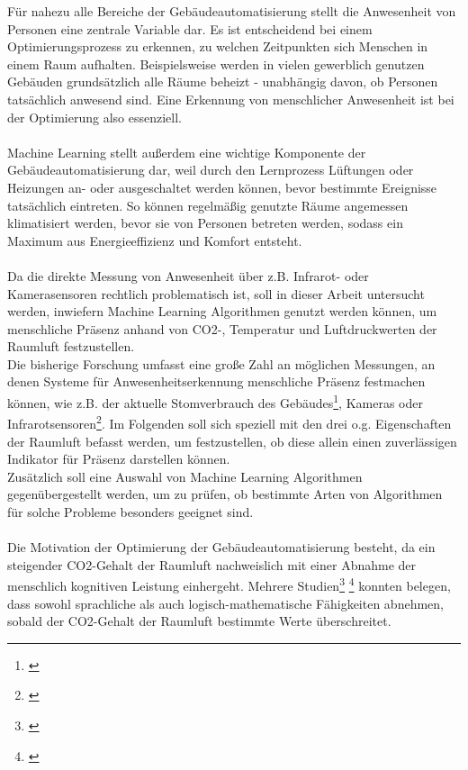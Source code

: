 Für nahezu alle Bereiche der Gebäudeautomatisierung stellt die Anwesenheit 
von Personen eine zentrale Variable dar. Es ist entscheidend bei einem Optimierungsprozess zu erkennen, zu
welchen Zeitpunkten sich Menschen in einem Raum aufhalten. Beispielsweise werden in vielen gewerblich 
genutzen Gebäuden grundsätzlich alle Räume beheizt - unabhängig davon, ob Personen tatsächlich anwesend sind. 
Eine Erkennung von menschlicher Anwesenheit ist bei der Optimierung also essenziell.\\\\
Machine Learning stellt außerdem eine wichtige Komponente der Gebäudeautomatisierung dar, weil durch den
Lernprozess Lüftungen oder Heizungen an- oder ausgeschaltet werden können, bevor bestimmte Ereignisse 
tatsächlich eintreten. So können regelmäßig genutzte Räume angemessen klimatisiert werden, bevor sie von 
Personen betreten werden, sodass ein Maximum aus Energieeffizienz und Komfort entsteht.\\\\
Da die direkte Messung von Anwesenheit über z.B. Infrarot- oder Kamerasensoren rechtlich problematisch ist, 
soll in dieser Arbeit untersucht werden, inwiefern Machine Learning Algorithmen genutzt werden können, 
um menschliche Präsenz anhand von CO2-, Temperatur und Luftdruckwerten der Raumluft festzustellen.\\
Die bisherige Forschung umfasst eine große Zahl an möglichen Messungen, an denen Systeme für 
Anwesenheitserkennung menschliche Präsenz festmachen können, wie z.B. der aktuelle Stomverbrauch 
des Gebäudes\footnote[1]{\cite{Kleiminger}}, Kameras oder Infrarotsensoren\footnote[2]{\cite{Krieger}}. 
Im Folgenden soll sich speziell mit den drei o.g. Eigenschaften der 
Raumluft befasst werden, um festzustellen, ob diese allein einen zuverlässigen Indikator für Präsenz 
darstellen können.\\
Zusätzlich soll eine Auswahl von Machine Learning Algorithmen gegenübergestellt werden, um zu prüfen, ob
bestimmte Arten von Algorithmen für solche Probleme besonders geeignet sind.\\\\
Die Motivation der Optimierung der Gebäudeautomatisierung besteht, da ein steigender CO2-Gehalt der 
Raumluft nachweislich mit einer Abnahme der menschlich kognitiven Leistung einhergeht. 
Mehrere Studien\footnote[3]{\cite{SNOW}} \footnote[4]{\cite{RIHAMJABER}} konnten belegen, dass 
sowohl sprachliche als auch logisch-mathematische Fähigkeiten abnehmen, sobald 
der CO2-Gehalt der Raumluft bestimmte Werte überschreitet.\\ 

